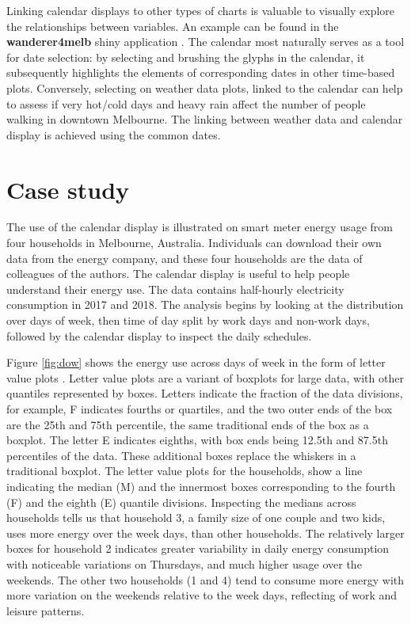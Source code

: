 \documentclass[12pt]{article}
\begin{document}
Linking calendar displays to other types of charts is valuable to
visually explore the relationships between variables. An example can be
found in the \textbf{wanderer4melb} shiny application
\citep{R-wanderer4melb}. The calendar most naturally serves as a tool
for date selection: by selecting and brushing the glyphs in the
calendar, it subsequently highlights the elements of corresponding dates
in other time-based plots. Conversely, selecting on weather data plots,
linked to the calendar can help to assess if very hot/cold days and
heavy rain affect the number of people walking in downtown Melbourne.
The linking between weather data and calendar display is achieved using
the common dates.

\hypertarget{case-study}{%
\section{Case study}\label{case-study}}

\label{sec:case}

The use of the calendar display is illustrated on smart meter energy
usage from four households in Melbourne, Australia. Individuals can
download their own data from the energy company, and these four
households are the data of colleagues of the authors. The calendar
display is useful to help people understand their energy use. The data
contains half-hourly electricity consumption in 2017 and 2018. The
analysis begins by looking at the distribution over days of week, then
time of day split by work days and non-work days, followed by the
calendar display to inspect the daily schedules.

Figure \ref{fig:dow} shows the energy use across days of week in the
form of letter value plots \citep{hofmann2017letter}. Letter value plots
are a variant of boxplots for large data, with other quantiles
represented by boxes. Letters indicate the fraction of the data
divisions, for example, F indicates fourths or quartiles, and the two
outer ends of the box are the 25th and 75th percentile, the same
traditional ends of the box as a boxplot. The letter E indicates
eighths, with box ends being 12.5th and 87.5th percentiles of the data.
These additional boxes replace the whiskers in a traditional boxplot.
The letter value plots for the households, show a line indicating the
median (M) and the innermost boxes corresponding to the fourth (F) and
the eighth (E) quantile divisions. Inspecting the medians across
households tells us that household 3, a family size of one couple and
two kids, uses more energy over the week days, than other households.
The relatively larger boxes for household 2 indicates greater
variability in daily energy consumption with noticeable variations on
Thursdays, and much higher usage over the weekends. The other two
households (1 and 4) tend to consume more energy with more variation on
the weekends relative to the week days, reflecting of work and leisure
patterns.
\end{document}
